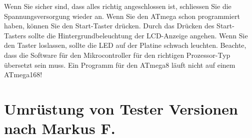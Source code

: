 Wenn Sie sicher sind, dass alles richtig angeschlossen ist, schliessen Sie
die Spannungsversorgung wieder an.
Wenn Sie den ATmega schon programmiert haben, können Sie den Start-Taster
drücken.
Durch das Drücken des Start-Tasters sollte die Hintergrundbeleuchtung
der LCD-Anzeige angehen.
Wenn Sie den Taster loslassen, sollte die LED auf der Platine schwach leuchten.
Beachte, dass die Software für den Mikrocontroller für den richtigen
Prozessor-Typ übersetzt sein muss. Ein Programm für den ATmega8 läuft
nicht auf einem ATmega168!

\section{Umrüstung von Tester Versionen nach Markus F.}
\label{sec:change_markus}
\begin{description}


\end{description}
